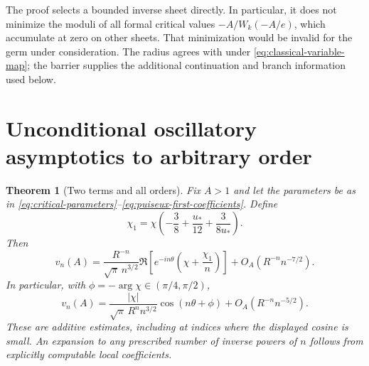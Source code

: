 \documentclass[11pt]{article}
\numberwithin{equation}{section}
\newtheorem{theorem}{Theorem}[section]
\theoremstyle{definition}
\theoremstyle{remark}
\begin{document}
The proof selects a bounded inverse sheet directly.  In particular, it
does not minimize the moduli of all formal critical values
$-A/W_k(-A/e)$, which accumulate at zero on other sheets.  That
minimization would be invalid for the germ under consideration.  The
radius agrees with \cite[Eq.~(2.9)]{KaluginJeffrey2012} under
\eqref{eq:classical-variable-map}; the barrier supplies the additional
continuation and branch information used below.

\section{Unconditional oscillatory asymptotics to arbitrary order}
\label{sec:velocity-asymptotics}

\begin{theorem}[Two terms and all orders]
\label{thm:velocity-asymptotics}
Fix $A>1$ and let the parameters be as in
\eqref{eq:critical-parameters}--\eqref{eq:puiseux-first-coefficients}.
Define
\begin{equation}\label{eq:chi-correction}
 \chi_1=\chi\left(-\frac38+\frac{u_*}{12}+\frac3{8u_*}\right).
\end{equation}
Then
\begin{equation}\label{eq:velocity-two-term}
 v_n(A)=\frac{R^{-n}}{\sqrt\pi\,n^{3/2}}
    \Re\left[e^{-in\theta}
                      \left(\chi+\frac{\chi_1}{n}\right)\right]
           +O_A(R^{-n}n^{-7/2}).
\end{equation}
In particular, with $\phi=-\arg\chi\in(\pi/4,\pi/2)$,
\begin{equation}\label{eq:velocity-leading-cosine}
 v_n(A)=\frac{|\chi|}{\sqrt\pi\,R^n n^{3/2}}
               \cos(n\theta+\phi)+O_A(R^{-n}n^{-5/2}).
\end{equation}
These are additive estimates, including at indices where the displayed
cosine is small.  An expansion to any prescribed number of inverse
powers of $n$ follows from explicitly computable local coefficients.
\end{theorem}
\end{document}
